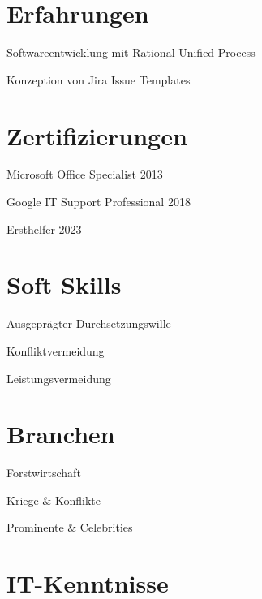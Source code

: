 \documentclass{germanskillsprofile}
\begin{document}
\section*{Erfahrungen}

  \begin{listbullet}
    \item Softwareentwicklung mit Rational Unified Process
    \item Konzeption von Jira Issue Templates
  \end{listbullet}

\section*{Zertifizierungen}

  \begin{listbullet}
    \item Microsoft Office Specialist 2013
    \item Google IT Support Professional 2018
    \item Ersthelfer 2023
  \end{listbullet}

\section*{Soft Skills}

  \begin{listbullet}
    \item Ausgeprägter Durchsetzungswille
    \item Konfliktvermeidung
    \item Leistungsvermeidung
  \end{listbullet}

\section*{Branchen}

  \begin{listbullet}
    \item Forstwirtschaft
    \item Kriege \& Konflikte
    \item Prominente \& Celebrities
  \end{listbullet}

\section*{IT-Kenntnisse}
\end{document}
